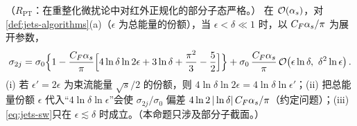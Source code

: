\begin{proposition}\label{prop:jets-sw}
（$R_{\mathrm{PT}}$：在重整化微扰论中对红外正规化的部分子态严格。）
在 $\mathcal{O}\!\left(\alpha_s\right)$，对\cref{def:jets-algorithms}(a)（$\epsilon$ 为总能量的份额），当 $\epsilon<\delta\ll1$ 时，以 $C_F\alpha_s/\pi$ 为展开参数，
\begin{equation}\label{eq:jets-sw}
\sigma_{2j}=\sigma_0\Big\{1-\frac{C_F\as}{\pi}\Big[4\ln\delta\ln2\epsilon+3\ln\delta+\frac{\pi^2}{3}-\frac52\Big]\Big\}
+\sigma_0\,\frac{C_F\as}{\pi}\,\order{\epsilon\ln\delta,\ \delta^2\ln\epsilon} .
\end{equation}
(i) 若 $\epsilon'=2\epsilon$ 为束流能量 $\sqrt s/2$ 的份额，则 $4\ln\delta\ln2\epsilon=4\ln\delta\ln\epsilon'$；(ii) 把总能量份额 $\epsilon$ 代入“$4\ln\delta\ln\epsilon$”会使 $\sigma_{2j}/\sigma_0$
偏差 $4\ln2\,|\ln\delta|\,C_F\alpha_s/\pi$（约定问题）；(iii) \cref{eq:jets-sw}只在 $\epsilon\lesssim\delta$ 时成立。（本命题只涉及部分子截面。）
\end{proposition}

